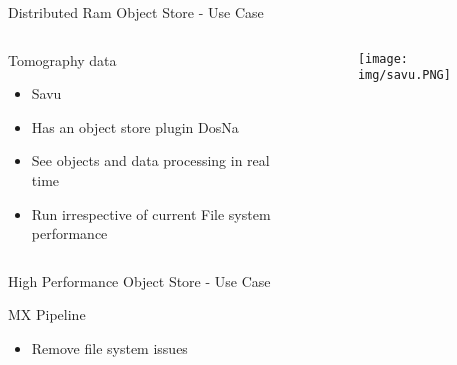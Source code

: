 \begin{frame}{Distributed Ram Object Store - Use Case}
    \begin{columns}
    \begin{column}{0.47\textwidth}
    \begin{block}{Tomography data}
        \begin{itemize}
            \item Savu
            \item Has an object store plugin DosNa
            \item See objects and data processing in real time
            \item Run irrespective of current File system performance 
        \end{itemize}
    \end{block}
    \end{column}
    \begin{column}{0.47\textwidth}
    \begin{figure}
        \centering
        \texttt{[image: img/savu.PNG]}
        \label{fig:my_label}
    \end{figure}
    \end{column}
\end{columns}
\end{frame}

\begin{frame}{High Performance Object Store - Use Case }
\begin{block}{MX Pipeline}
        \begin{itemize}
            \item Remove file system issues
        \end{itemize}
    \end{block}
\end{frame}